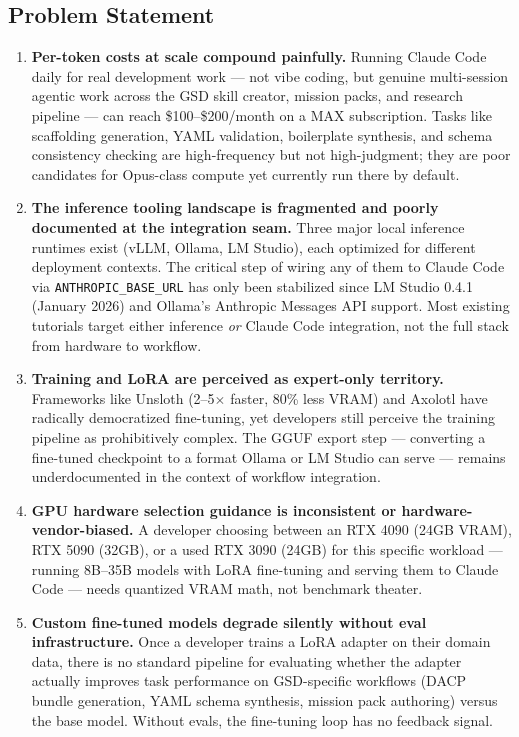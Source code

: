 \documentclass[11pt,letterpaper]{article}
\begin{document}
\subsection{Problem Statement}

\begin{enumerate}[leftmargin=*, label=\textbf{P\arabic*.}]

\item \textbf{Per-token costs at scale compound painfully.} Running Claude Code daily for real development work --- not vibe coding, but genuine multi-session agentic work across the GSD skill creator, mission packs, and research pipeline --- can reach \$100--\$200/month on a MAX subscription. Tasks like scaffolding generation, YAML validation, boilerplate synthesis, and schema consistency checking are high-frequency but not high-judgment; they are poor candidates for Opus-class compute yet currently run there by default.

\item \textbf{The inference tooling landscape is fragmented and poorly documented at the integration seam.} Three major local inference runtimes exist (vLLM, Ollama, LM Studio), each optimized for different deployment contexts. The critical step of wiring any of them to Claude Code via \texttt{ANTHROPIC\_BASE\_URL} has only been stabilized since LM Studio 0.4.1 (January 2026) and Ollama's Anthropic Messages API support. Most existing tutorials target either inference \emph{or} Claude Code integration, not the full stack from hardware to workflow.

\item \textbf{Training and LoRA are perceived as expert-only territory.} Frameworks like Unsloth (2--5$\times$ faster, 80\% less VRAM) and Axolotl have radically democratized fine-tuning, yet developers still perceive the training pipeline as prohibitively complex. The GGUF export step --- converting a fine-tuned checkpoint to a format Ollama or LM Studio can serve --- remains underdocumented in the context of workflow integration.

\item \textbf{GPU hardware selection guidance is inconsistent or hardware-vendor-biased.} A developer choosing between an RTX 4090 (24GB VRAM), RTX 5090 (32GB), or a used RTX 3090 (24GB) for this specific workload --- running 8B--35B models with LoRA fine-tuning and serving them to Claude Code --- needs quantized VRAM math, not benchmark theater.

\item \textbf{Custom fine-tuned models degrade silently without eval infrastructure.} Once a developer trains a LoRA adapter on their domain data, there is no standard pipeline for evaluating whether the adapter actually improves task performance on GSD-specific workflows (DACP bundle generation, YAML schema synthesis, mission pack authoring) versus the base model. Without evals, the fine-tuning loop has no feedback signal.

\end{enumerate}
\end{document}
